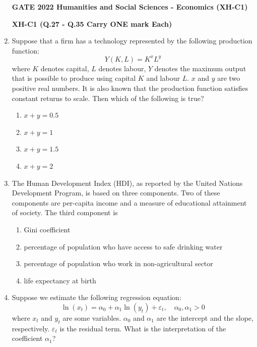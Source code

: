 \documentclass[journal,12pt,onecolumn]{exam}
\theoremstyle{remark}
\begin{document}
\begin{enumerate}
\newpage
\textbf{GATE 2022 Humanities and Social Sciences - Economics (XH-C1)}

\vspace{2em}

\textbf{XH-C1 (Q.27 - Q.35 Carry ONE mark Each)}
\item Suppose that a firm has a technology represented by the following production function:
  \[
    Y(K, L) = K^x L^y
  \]
  where $K$ denotes capital, $L$ denotes labour, $Y$ denotes the maximum output that is possible to produce using capital $K$ and labour $L$. $x$ and $y$ are two positive real numbers. It is also known that the production function satisfies constant returns to scale. Then which of the following is true?

  \begin{enumerate}
    \item $x + y = 0.5$
    \item $x + y = 1$
    \item $x + y = 1.5$
    \item $x + y = 2$
  \end{enumerate}
  
  \vspace{2em}

  \item The Human Development Index (HDI), as reported by the United Nations Development Program, is based on three components. Two of these components are per-capita income and a measure of educational attainment of society. The third component is

  \begin{enumerate}
    \item Gini coefficient
    \item percentage of population who have access to safe drinking water
    \item percentage of population who work in non-agricultural sector
    \item life expectancy at birth
  \end{enumerate}

 \item Suppose we estimate the following regression equation:
  \[
    \ln(x_t) = \alpha_0 + \alpha_1 \ln(y_t) + \varepsilon_t, \quad \alpha_0, \alpha_1 > 0
  \]
  where $x_t$ and $y_t$ are some variables. $\alpha_0$ and $\alpha_1$ are the intercept and the slope, respectively. $\varepsilon_t$ is the residual term. What is the interpretation of the coefficient $\alpha_1$?


\end{enumerate}
\end{document}
